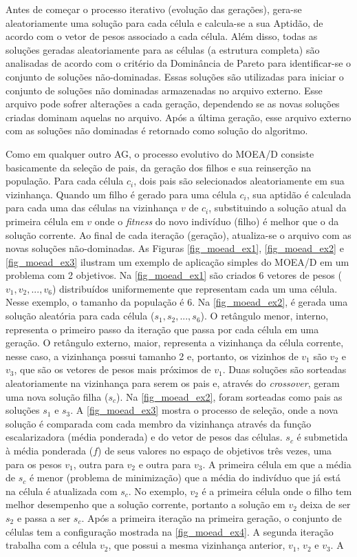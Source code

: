 Antes de começar o processo iterativo (evolução das gerações), gera-se aleatoriamente uma solução para cada célula e calcula-se a sua
Aptidão, de acordo com o vetor de pesos associado a cada célula. Além disso, todas as soluções geradas aleatoriamente para as células (a estrutura completa) são analisadas de acordo com o critério da Dominância de Pareto para identificar-se o conjunto de soluções não-dominadas. Essas soluções são utilizadas para iniciar o conjunto de soluções não dominadas armazenadas no arquivo externo. Esse arquivo pode sofrer alterações a cada geração, dependendo se as novas soluções criadas dominam aquelas no arquivo. Após a última geração, esse arquivo externo com as soluções não dominadas é retornado como solução do algoritmo.

Como em qualquer outro AG, o processo evolutivo do MOEA/D consiste basicamente da seleção de pais, da geração dos filhos e sua reinserção na população. Para cada célula $c_i$, dois pais são selecionados aleatoriamente em sua vizinhança. Quando um filho é gerado para uma célula $c_i$, sua aptidão é calculada para cada uma das células na vizinhança $v$ de $c_i$, substituindo a solução atual da primeira célula em $v$ onde o \textit{fitness} do novo indivíduo (filho) é melhor que o da solução corrente. Ao final de cada iteração (geração), atualiza-se o arquivo com as novas soluções não-dominadas. As Figuras \ref{fig_moead_ex1}, \ref{fig_moead_ex2} e \ref{fig_moead_ex3} ilustram um exemplo de aplicação simples do MOEA/D em um problema com 2 objetivos. Na \autoref{fig_moead_ex1} são criados 6 vetores de pesos ($v_1, v_2, ..., v_6$) distribuídos uniformemente que representam cada um uma célula. Nesse exemplo, o tamanho da população é 6. Na \autoref{fig_moead_ex2}, é gerada uma solução aleatória para cada célula ($s_1, s_2, ..., s_6$). O retângulo menor, interno, representa o primeiro passo da iteração que passa por cada célula em uma geração. O retângulo externo, maior, representa a vizinhança da célula corrente, nesse caso, a vizinhança possui tamanho 2 e, portanto, os vizinhos de $v_1$ são $v_2$ e $v_3$, que são os vetores de pesos mais próximos de $v_1$. Duas soluções são sorteadas aleatoriamente na vizinhança para serem os pais e, através do \textit{crossover}, geram uma nova solução filha ($s_c$). Na \autoref{fig_moead_ex2}, foram sorteadas como pais as soluções $s_1$ e $s_3$. A \autoref{fig_moead_ex3} mostra o processo de seleção, onde a nova solução é comparada com cada membro da vizinhança através da função escalarizadora (média ponderada) e do vetor de pesos das células. $s_c$ é submetida à média ponderada ($f$) de seus valores no espaço de objetivos três vezes, uma para os pesos $v_1$, outra para $v_2$ e outra para $v_3$. A primeira célula em que a média de $s_c$ é menor (problema de minimização) que a média do indivíduo que já está na célula é atualizada com $s_c$. No exemplo, $v_2$ é a primeira célula onde o filho tem melhor desempenho que a solução corrente, portanto a solução em $v_2$ deixa de ser $s_2$ e passa a ser $s_c$. Após a primeira iteração na primeira geração, o conjunto de células tem a configuração mostrada na  \autoref{fig_moead_ex4}. A segunda iteração trabalha com a célula $v_2$, que possui a mesma vizinhança anterior, $v_1$, $v_2$ e $v_3$. A 